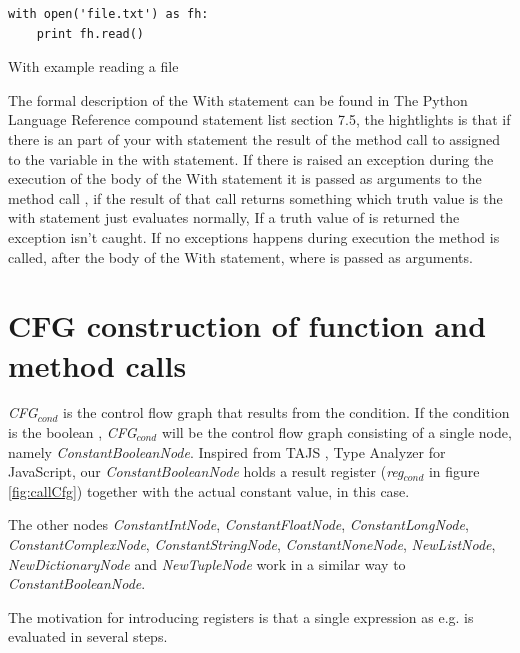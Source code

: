 \begin{listing}[H]
	\begin{verbatim}
with open('file.txt') as fh:
	print fh.read()
	\end{verbatim}
	\caption{With example reading a file}\label{code:withExample}
\end{listing}

The formal description of the With statement can be found in The Python Language Reference compound statement list\cite{pyref.compound} section 7.5, 
the hightlights is that if there is an  part of your with statement the result of the method call to  
assigned to the variable in the with statement. If there is raised an exception during the execution of the body of the With statement it is 
passed as arguments to the method call , if the result of that call returns something which truth value is  
the with statement just evaluates normally, If a truth value of  is returned the exception isn't caught. 
If no exceptions happens during execution the  method is called, after the body of the With statement, 
where  is passed as arguments.

\section{CFG construction of function and method calls}
\label{CFG calls}
\textit{CFG$_{\textit{cond}}$} is the control flow graph that results from the condition. If the condition is the boolean , 
\textit{CFG$_{\textit{cond}}$} will be the control flow graph consisting of a single node, namely \textit{ConstantBooleanNode}. 
Inspired from TAJS \cite{tajs}, Type Analyzer for JavaScript, our \textit{ConstantBooleanNode} holds a result register (\textit{reg$_{\textit{cond}}$} in figure \ref{fig:callCfg}) 
together with the actual constant value,  in this case.

The other nodes \textit{ConstantIntNode}, \textit{ConstantFloatNode}, \textit{ConstantLongNode}, \textit{ConstantComplexNode}, \textit{ConstantStringNode}, 
\textit{ConstantNoneNode}, \textit{NewListNode}, \textit{NewDictionaryNode} and \textit{NewTupleNode} work in a similar way to \textit{ConstantBooleanNode}. 

\begin{sloppypar}
  The motivation for introducing registers is that a single expression as e.g.  is evaluated in several steps. 
\end{sloppypar}

